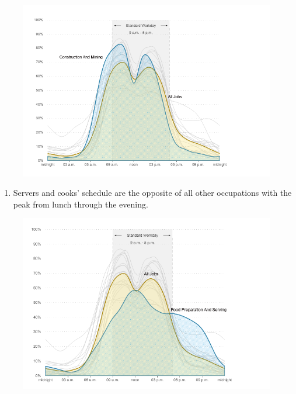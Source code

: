 \documentclass[]{book}
\providecommand{\tightlist}{%
  \setlength{\itemsep}{0pt}\setlength{\parskip}{0pt}}
\theoremstyle{definition}
\theoremstyle{definition}
\theoremstyle{definition}
\theoremstyle{remark}
\begin{document}
\begin{figure}
\centering
\includegraphics{images/construction.png}
\caption{}
\end{figure}

\begin{enumerate}
\def\labelenumi{\arabic{enumi}.}
\setcounter{enumi}{1}
\tightlist
\item
  Servers and cooks' schedule are the opposite of all other occupations
  with the peak from lunch through the evening.
\end{enumerate}

\begin{figure}
\centering
\includegraphics{images/server_cook.png}
\caption{}
\end{figure}
\end{document}
